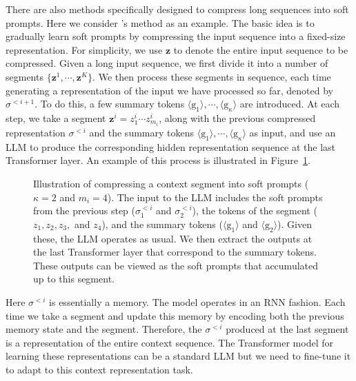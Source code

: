 There are also methods specifically designed to compress long sequences into soft prompts. Here we consider \citet{chevalier-etal:2023adapting}'s method as an example. The basic idea is to gradually learn soft prompts by compressing the input sequence into a fixed-size representation. For simplicity, we use $\mathbf z$ to denote the entire input sequence to be compressed. Given a long input sequence, we first divide it into a number of segments $\{\mathbf{z}^1, \cdots, \mathbf{z}^K\}$. We then process these segments in sequence, each time generating a representation of the input we have processed so far, denoted by $\sigma^{<i+1}$. To do this, a few summary tokens ${\langle \mathrm{g}_1 \rangle, \cdots, \langle \mathrm{g}_{\kappa} \rangle}$ are introduced. At each step, we take a segment $\mathbf{z}^i = z_1^{i} \cdots z_{m_i}^{i}$, along with the previous compressed representation $\sigma^{<i}$ and the summary tokens $\langle \mathrm{g}_1 \rangle, \cdots, \langle \mathrm{g}_{\kappa} \rangle$ as input, and use an LLM to produce the corresponding hidden representation sequence at the last Transformer layer. An example of this process is illustrated in Figure~\ref{fig:compressing-context-with-summary-tokens}.

\begin{figure}[!t]
\centering

\caption{Illustration of compressing a context segment into soft prompts ($\kappa = 2$ and $m_i = 4$). The input to the LLM includes the soft prompts from the previous step ($\sigma^{<i}_1$ and $\sigma^{<i}_2$), the tokens of the segment ($z_1, z_2, z_3,$ and $z_4$), and the summary tokens ($\langle \mathrm{g}_1 \rangle$ and $\langle \mathrm{g}_2 \rangle$). Given these, the LLM operates as usual. We then extract the outputs at the last Transformer layer that correspond to the summary tokens. These outputs can be viewed as the soft prompts that accumulated up to this segment.}
\label{fig:compressing-context-with-summary-tokens}
\end{figure}

Here $\sigma^{<i}$ is essentially a memory. The model operates in an RNN fashion. Each time we take a segment and update this memory by encoding both the previous memory state and the segment. Therefore, the $\sigma^{<i}$ produced at the last segment is a representation of the entire context sequence. The Transformer model for learning these representations can be a standard LLM but we need to fine-tune it to adapt to this context representation task.


